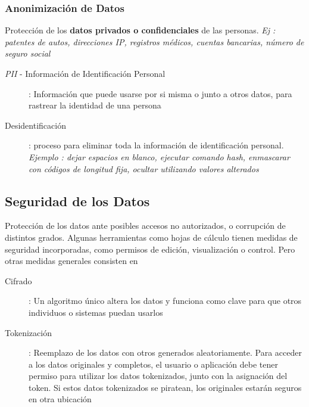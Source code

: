 \subsubsection{Anonimización de Datos}
Protección de los \textbf{datos privados o confidenciales} de las personas. \textit{Ej : patentes de autos, direcciones IP, registros médicos, cuentas bancarias, número de seguro social}
\begin{description}
    \item [\textit{PII} - Información de Identificación Personal]{ : Información que puede usarse por si misma o junto a otros datos, para rastrear la identidad de una persona}
    \item [Desidentificación]{ : proceso para eliminar toda la información de identificación personal. \textit{Ejemplo : dejar espacios en blanco, ejecutar comando hash, enmascarar con códigos de longitud fija, ocultar utilizando valores alterados}}
\end{description}

\subsection{Seguridad de los Datos}
Protección de los datos ante posibles accesos no autorizados, o corrupción de distintos grados. Algunas herramientas como hojas de cálculo tienen medidas de seguridad incorporadas, como permisos de edición, visualización o control. Pero otras medidas generales consisten en
\begin{description}
    \item [Cifrado]{ : Un algoritmo único altera los datos y funciona como clave para que otros individuos o sistemas puedan usarlos}
    \item [Tokenización]{ : Reemplazo de los datos con otros generados aleatoriamente. Para acceder a los datos originales y completos, el usuario o aplicación debe tener permiso para utilizar los datos tokenizados, junto con la asignación del token. Si estos datos tokenizados se piratean, los originales estarán seguros en otra ubicación}
\end{description}



\newpage